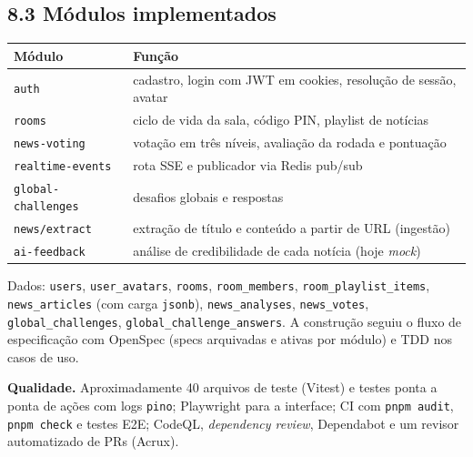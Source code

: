 \documentclass[
  brazilian,
  11pt,
]{article}
\newcounter{none} %
\begin{document}
\subsection{8.3 Módulos implementados}\label{muxf3dulos-implementados}

{\def\LTcaptype{none} %
\begin{longtable}[]{@{}
  >{\raggedright\arraybackslash}p{}
  >{\raggedright\arraybackslash}p{}@{}}
\toprule\noalign{}
\begin{minipage}[b]{\linewidth}\raggedright
Módulo
\end{minipage} & \begin{minipage}[b]{\linewidth}\raggedright
Função
\end{minipage} \\
\midrule\noalign{}
\endhead
\bottomrule\noalign{}
\endlastfoot
\texttt{auth} & cadastro, login com JWT em cookies, resolução de sessão, avatar \\
\texttt{rooms} & ciclo de vida da sala, código PIN, playlist de notícias \\
\texttt{news-voting} & votação em três níveis, avaliação da rodada e pontuação \\
\texttt{realtime-events} & rota SSE e publicador via Redis pub/sub \\
\texttt{global-challenges} & desafios globais e respostas \\
\texttt{news/extract} & extração de título e conteúdo a partir de URL (ingestão) \\
\texttt{ai-feedback} & análise de credibilidade de cada notícia (hoje \emph{mock}) \\
\end{longtable}
}

Dados: \texttt{users}, \texttt{user\_avatars}, \texttt{rooms}, \texttt{room\_members}, \texttt{room\_playlist\_items}, \texttt{news\_articles} (com carga \texttt{jsonb}), \texttt{news\_analyses}, \texttt{news\_votes}, \texttt{global\_challenges}, \texttt{global\_challenge\_answers}. A construção seguiu o fluxo de especificação com OpenSpec (specs arquivadas e ativas por módulo) e TDD nos casos de uso.

\textbf{Qualidade.} Aproximadamente 40 arquivos de teste (Vitest) e testes ponta a ponta de ações com logs \texttt{pino}; Playwright para a interface; CI com \texttt{pnpm\ audit}, \texttt{pnpm\ check} e testes E2E; CodeQL, \emph{dependency review}, Dependabot e um revisor automatizado de PRs (Acrux).
\end{document}
